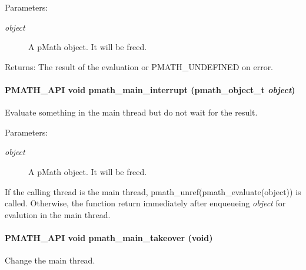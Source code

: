 \begin{Desc}
\item[Parameters:]
\begin{description}
\item[{\em object}]A pMath object. It will be freed. \end{description}
\end{Desc}
\begin{Desc}
\item[Returns:]The result of the evaluation or PMATH\_\-UNDEFINED on error. \end{Desc}
\hypertarget{group__mainthread_g3514921bc9c7fcf88513abe999689d8b}{
\paragraph[{pmath\_\-main\_\-interrupt}]{\setlength{\rightskip}{0pt plus 5cm}PMATH\_\-API void pmath\_\-main\_\-interrupt ({\bf pmath\_\-object\_\-t} {\em object})}\hfill}
\label{group__mainthread_g3514921bc9c7fcf88513abe999689d8b}


Evaluate something in the main thread but do not wait for the result. 

\begin{Desc}
\item[Parameters:]
\begin{description}
\item[{\em object}]A pMath object. It will be freed.\end{description}
\end{Desc}
If the calling thread is the main thread, pmath\_\-unref(pmath\_\-evaluate(object)) is called. Otherwise, the function return immediately after enqueueing {\em object\/} for evalution in the main thread. \hypertarget{group__mainthread_g0252e2ab998fdee2fd3e5a8a96b3ef77}{
\paragraph[{pmath\_\-main\_\-takeover}]{\setlength{\rightskip}{0pt plus 5cm}PMATH\_\-API void pmath\_\-main\_\-takeover (void)}\hfill}
\label{group__mainthread_g0252e2ab998fdee2fd3e5a8a96b3ef77}


Change the main thread. 

